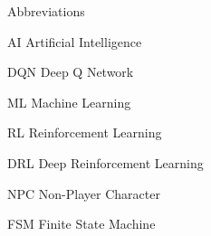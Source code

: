 
\begin{dictionary}{Abbreviations}
\item[AI]	Artificial Intelligence
\item[DQN]	Deep Q Network
\item[ML]	Machine Learning
\item[RL]	Reinforcement Learning
\item[DRL]  Deep Reinforcement Learning
\item[NPC]	Non-Player Character
\item[FSM]	Finite State Machine
\end{dictionary}
